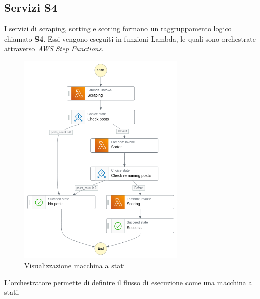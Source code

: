 \subsection{Servizi S4}
I servizi di scraping, sorting e scoring formano un raggruppamento logico chiamato \textbf{S4}.
Essi vengono eseguiti in funzioni Lambda, le quali sono orchestrate attraverso \textit{AWS Step Functions}.
\begin{figure}[H]
    \includegraphics[width=8cm]{sezioni/images/stepfunctions_graph.png}
    \centering
    \caption{Visualizzazione macchina a stati}
\end{figure}
L'orchestratore permette di definire il flusso di esecuzione come una macchina a stati.

